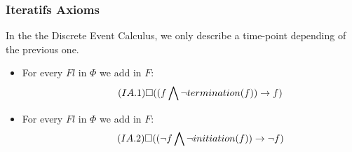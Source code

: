 \subsubsection{Iteratifs Axioms}

In the the Discrete Event Calculus, we only describe a time-point depending of the previous one.

\begin{itemize}
  \item
    For every $Fl$ in $\Phi$ we add in $F$:
    \begin{equation}\tag{$IA.1$}
      \square((f \bigwedge \neg termination(f)) \rightarrow f)
    \end{equation}
  \item
    For every $Fl$ in $\Phi$ we add in $F$:
    \begin{equation}\tag{$IA.2$}
      \square((\neg f \bigwedge \neg initiation(f)) \rightarrow \neg f)
    \end{equation}
\end{itemize}


